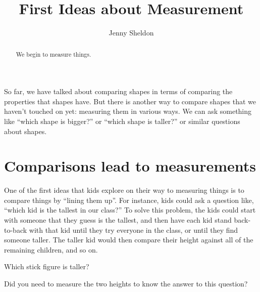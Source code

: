 \documentclass{ximera}
\title{First Ideas about Measurement}
\author{Jenny Sheldon}
\begin{document}
\begin{abstract}
We begin to measure things.
\end{abstract}
\maketitle

So far, we have talked about comparing shapes in terms of comparing the properties that shapes have. But there is another way to compare shapes that we haven't touched on yet: measuring them in various ways. We can ask something like ``which shape is bigger?'' or ``which shape is taller?'' or similar questions about shapes. 

\section{Comparisons lead to measurements}
One of the first ideas that kids explore on their way to measuring things is to compare things by ``lining them up''. For instance, kids could ask a question like, ``which kid is the tallest in our class?'' To solve this problem, the kids could start with someone that they guess is the tallest, and then have each kid stand back-to-back with that kid until they try everyone in the class, or until they find someone taller. The taller kid would then compare their height against all of the remaining children, and so on.
\begin{question}
Which stick figure is taller?
\begin{image}
\end{image}
\begin{multipleChoice}
\end{multipleChoice}

Did you need to measure the two heights to know the answer to this question?
\begin{multipleChoice}
\end{multipleChoice}
\end{question}
\end{document}
